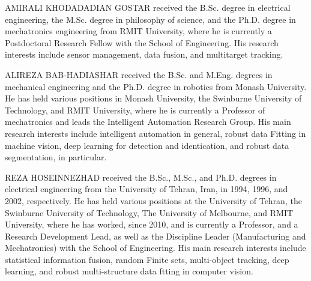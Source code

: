 \documentclass[journal]{IEEEtran}
\begin{document}
\begin{IEEEbiographynophoto}{AMIRALI KHODADADIAN GOSTAR}
received the B.Sc. degree in electrical engineering,
the M.Sc. degree in philosophy of science, and
the Ph.D. degree in mechatronics engineering
from RMIT University, where he is currently a
Postdoctoral Research Fellow with the School of
Engineering. His research interests include sensor
management, data fusion, and multitarget tracking.
\end{IEEEbiographynophoto}
\begin{IEEEbiographynophoto}{ALIREZA BAB-HADIASHAR}
received the B.Sc.
and M.Eng. degrees in mechanical engineering
and the Ph.D. degree in robotics from Monash University.
He has held various positions in Monash
University, the Swinburne University of Technology,
and RMIT University, where he is currently a
Professor of mechatronics and leads the Intelligent
Automation Research Group. His main research
interests include intelligent automation in general,
robust data Fitting in machine vision, deep learning
for detection and identication, and robust data segmentation, in particular.
\end{IEEEbiographynophoto}
\begin{IEEEbiographynophoto}{REZA HOSEINNEZHAD}
received the B.Sc.,
M.Sc., and Ph.D. degrees in electrical engineering
from the University of Tehran, Iran, in 1994,
1996, and 2002, respectively. He has held various
positions at the University of Tehran, the Swinburne
University of Technology, The University of
Melbourne, and RMIT University, where he has
worked, since 2010, and is currently a Professor,
and a Research Development Lead, as well as the
Discipline Leader (Manufacturing and Mechatronics)
with the School of Engineering. His main research interests include
statistical information fusion, random Finite sets, multi-object tracking, deep
learning, and robust multi-structure data ftting in computer vision.
\end{IEEEbiographynophoto}
\end{document}
